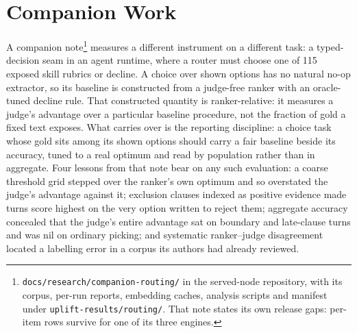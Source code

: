 \documentclass[10pt,twocolumn]{article}
\begin{document}
\section{Companion Work}\label{sec:companion}
A companion note\footnote{\texttt{docs/research/companion-routing/} in the served-node repository, with its corpus, per-run reports, embedding caches, analysis scripts and manifest under \texttt{uplift-results/routing/}. That note states its own release gaps: per-item rows survive for one of its three engines.} measures a different instrument on a different task: a typed-decision seam in an agent runtime, where a router must choose one of 115 exposed skill rubrics or decline. A choice over shown options has no natural no-op extractor, so its baseline is constructed from a judge-free ranker with an oracle-tuned decline rule. That constructed quantity is ranker-relative: it measures a judge's advantage over a particular baseline procedure, not the fraction of gold a fixed text exposes. What carries over is the reporting discipline: a choice task whose gold sits among its shown options should carry a fair baseline beside its accuracy, tuned to a real optimum and read by population rather than in aggregate. Four lessons from that note bear on any such evaluation: a coarse threshold grid stepped over the ranker's own optimum and so overstated the
judge's advantage against it; exclusion clauses indexed as positive evidence made turns score
highest on the very option written to reject them; aggregate accuracy concealed that the judge's
entire advantage sat on boundary and late-clause turns and was nil on ordinary picking; and
systematic ranker--judge disagreement located a labelling error in a corpus its authors had already
reviewed.
\end{document}
